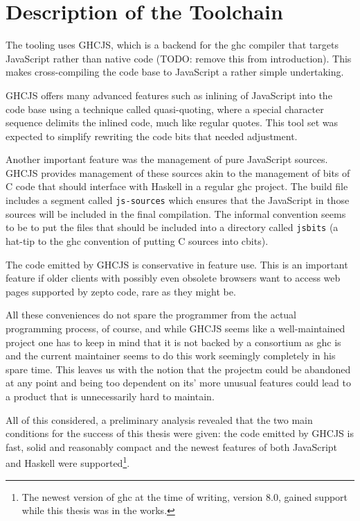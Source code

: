 \documentclass[oneside,11pt,xetex]{scrbook}
\begin{document}
\section{Description of the Toolchain}

The tooling uses GHCJS, which is a backend for the \gls{ghc} compiler that targets JavaScript rather
than native code (TODO: remove this from introduction). This makes cross-compiling the code base to
JavaScript a rather simple undertaking.

GHCJS offers many advanced features such as inlining of JavaScript into the code
base using a technique called quasi-quoting, where a special character sequence delimits the
inlined code, much like regular quotes. This tool set was expected to simplify rewriting the code
bits that needed adjustment.

Another important feature was the management of pure JavaScript sources. GHCJS provides management
of these sources akin to the management of bits of C code that should interface with Haskell in a
regular \gls{ghc} project. The build file includes a segment called \texttt{js-sources} which ensures
that the JavaScript in those sources will be included in the final compilation. The informal convention
seems to be to put the files that should be included into a directory called \texttt{jsbits} (a hat-tip
to the \gls{ghc} convention of putting C sources into cbits).

The code emitted by GHCJS is conservative in feature use. This is an important feature if older clients
with possibly even obsolete browsers want to access web pages supported by zepto code, rare as they might
be.

All these conveniences do not spare the programmer from the actual programming process, of course,
and while GHCJS seems like a well-maintained project one has to keep in mind that it is not backed
by a consortium as \gls{ghc} is and the current maintainer seems to do this work seemingly completely
in his spare time. This leaves us with the notion that the projectm could be abandoned at any point
and being too dependent on its' more unusual features could lead to a product that is unnecessarily
hard to maintain.

All of this considered, a preliminary analysis revealed that the two main conditions for the success
of this thesis were given: the code emitted by GHCJS is fast, solid and reasonably compact and the
newest features of both JavaScript and Haskell were supported\footnote{The newest version of \gls{ghc}
at the time of writing, version 8.0, gained support while this thesis was in the works.}.
\end{document}
